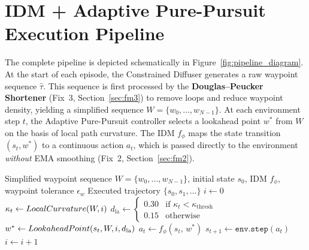 \documentclass[12pt, a4paper, oneside]{report}
\theoremstyle{definition}
\newcommand{\dlookahead}{d_{\mathrm{la}}}
\newcommand{\norm}[1]{\left\|#1\right\|}
\begin{document}
\section{IDM + Adaptive Pure-Pursuit Execution Pipeline}
\label{sec:pipeline}

The complete pipeline is depicted schematically in
Figure~\ref{fig:pipeline_diagram}. At the start of each episode,
the Constrained Diffuser generates a raw waypoint sequence
$\hat{\tau}$. This sequence is first processed by the
\textbf{Douglas--Peucker Shortener} (Fix~3,
Section~\ref{sec:fm3}) to remove loops and reduce waypoint
density, yielding a simplified sequence
$W = \{w_0, \ldots, w_{N-1}\}$. At each environment step $t$, the
Adaptive Pure-Pursuit controller selects a lookahead point $w^*$
from $W$ on the basis of local path curvature. The IDM $f_\phi$
maps the state transition $(s_t, w^*)$ to a continuous action
$a_t$, which is passed directly to the environment \emph{without}
EMA smoothing (Fix~2, Section~\ref{sec:fm2}).

\begin{algorithm}[H]
\caption{IDM + Adaptive Pure-Pursuit Execution Loop}
\label{alg:pipeline}
\begin{algorithmic}[1]
\Require Simplified waypoint sequence
  $W = \{w_0,\ldots,w_{N-1}\}$,
  initial state $s_0$, IDM $f_\phi$, waypoint tolerance
  $\epsilon_w$
\Ensure Executed trajectory $\{s_0, s_1, \ldots\}$
\State $i \gets 0$ 
  \State $\kappa_t \gets LocalCurvature(W, i)$
  \State $\dlookahead \gets
    \begin{cases}
      0.30 & \text{if } \kappa_t < \kappa_{\mathrm{thresh}}\\
      0.15 & \text{otherwise}
    \end{cases}$
  \State $w^* \gets \Call{LookaheadPoint}{s_t, W, i, \dlookahead}$
  \State $a_t \gets f_\phi(s_t,\, w^*)$
  \State $s_{t+1} \gets \texttt{env.step}(a_t)$
  \If{$\norm{s_{t+1}^{xy} - w_i} < \epsilon_w$}
    \State $i \gets i + 1$
  \EndIf
\EndWhile
\end{algorithmic}
\end{algorithm}
\end{document}
